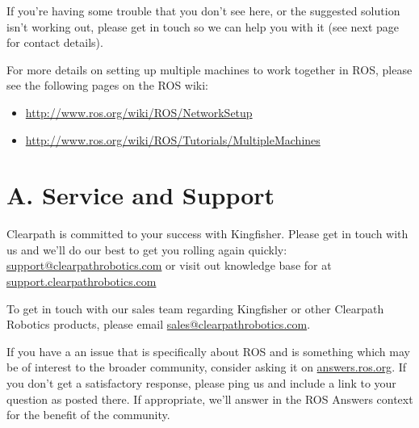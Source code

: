 \documentclass[]{clearpath-latex/clearpath-manual}
\begin{document}
If you’re having some trouble that you don’t see here, or the suggested solution isn’t working out, please get in touch so we can help you with it (see next page for contact details).

For more details on setting up multiple machines to work together in ROS, please see the following pages on the ROS wiki:

\begin{itemize}[nolistsep]
	\item \url{http://www.ros.org/wiki/ROS/NetworkSetup}
	\item \url{http://www.ros.org/wiki/ROS/Tutorials/MultipleMachines}
\end{itemize}

\newpage

\section{A. Service and Support}
Clearpath is committed to your success with Kingfisher. Please get in touch with us and we'll
do our best to get you rolling again quickly: \href{mailto:support@clearpathrobotics.com}{support@clearpathrobotics.com}
or visit out knowledge base for at \href{http://support.clearpathrobotics.com}{support.clearpathrobotics.com}

To get in touch with our sales team regarding Kingfisher or other Clearpath Robotics products, please
email \href{mailto:sales@clearpathrobotics.com}{sales@clearpathrobotics.com}.

If you have a an issue that is specifically about ROS and is something which may be of interest
to the broader community, consider asking it on \href{http://answers.ros.org}{answers.ros.org}.
If you don't get a satisfactory response, please ping us and include a link to your question
as posted there. If appropriate, we'll answer in the ROS Answers context for the benefit of the
community.
\end{document}
